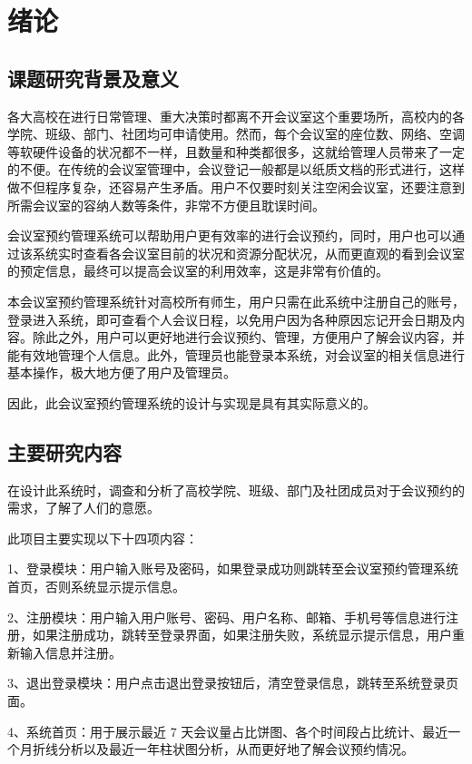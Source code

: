 \documentclass{izdthesis}
\begin{document}
\izdtableofcontents

\izdmainmatter

\chapter{绪论}

\section{课题研究背景及意义}
各大高校在进行日常管理、重大决策时都离不开会议室这个重要场所，高校内的各学院、班级、部门、社团均可申请使用。然而，每个会议室的座位数、网络、空调等软硬件设备的状况都不一样，且数量和种类都很多，这就给管理人员带来了一定的不便。在传统的会议室管理中，会议登记一般都是以纸质文档的形式进行，这样做不但程序复杂，还容易产生矛盾\cite{ref1}。用户不仅要时刻关注空闲会议室，还要注意到所需会议室的容纳人数等条件，非常不方便且耽误时间。

会议室预约管理系统可以帮助用户更有效率的进行会议预约，同时，用户也可以通过该系统实时查看各会议室目前的状况和资源分配状况，从而更直观的看到会议室的预定信息，最终可以提高会议室的利用效率，这是非常有价值的。

本会议室预约管理系统针对高校所有师生，用户只需在此系统中注册自己的账号，登录进入系统，即可查看个人会议日程，以免用户因为各种原因忘记开会日期及内容。除此之外，用户可以更好地进行会议预约、管理，方便用户了解会议内容，并能有效地管理个人信息。此外，管理员也能登录本系统，对会议室的相关信息进行基本操作，极大地方便了用户及管理员。

因此，此会议室预约管理系统的设计与实现是具有其实际意义的。

\section{主要研究内容}
在设计此系统时，调查和分析了高校学院、班级、部门及社团成员对于会议预约的需求，了解了人们的意愿。

此项目主要实现以下十四项内容：

1、登录模块：用户输入账号及密码，如果登录成功则跳转至会议室预约管理系统首页，否则系统显示提示信息。

2、注册模块：用户输入用户账号、密码、用户名称、邮箱、手机号等信息进行注册，如果注册成功，跳转至登录界面，如果注册失败，系统显示提示信息，用户重新输入信息并注册。

3、退出登录模块：用户点击退出登录按钮后，清空登录信息，跳转至系统登录页面。

4、系统首页：用于展示最近 7 天会议量占比饼图、各个时间段占比统计、最近一个月折线分析以及最近一年柱状图分析，从而更好地了解会议预约情况。
\end{document}
